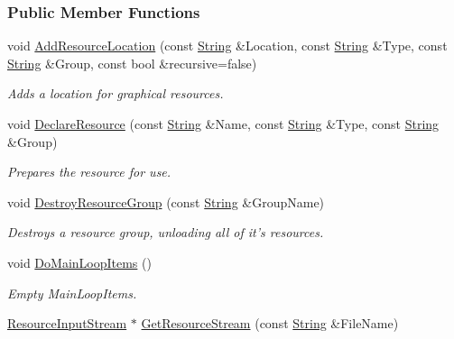 \subsubsection*{Public Member Functions}
\begin{DoxyCompactItemize}
\item 
void \hyperlink{classphys_1_1ResourceManager_a0d7d3adce2ad4c70a3e867396e17b090}{AddResourceLocation} (const \hyperlink{namespacephys_aa03900411993de7fbfec4789bc1d392e}{String} \&Location, const \hyperlink{namespacephys_aa03900411993de7fbfec4789bc1d392e}{String} \&Type, const \hyperlink{namespacephys_aa03900411993de7fbfec4789bc1d392e}{String} \&Group, const bool \&recursive=false)
\begin{DoxyCompactList}\small\item\em Adds a location for graphical resources. \item\end{DoxyCompactList}\item 
void \hyperlink{classphys_1_1ResourceManager_a6ac7835a02dff32e60a73320f9c9dabb}{DeclareResource} (const \hyperlink{namespacephys_aa03900411993de7fbfec4789bc1d392e}{String} \&Name, const \hyperlink{namespacephys_aa03900411993de7fbfec4789bc1d392e}{String} \&Type, const \hyperlink{namespacephys_aa03900411993de7fbfec4789bc1d392e}{String} \&Group)
\begin{DoxyCompactList}\small\item\em Prepares the resource for use. \item\end{DoxyCompactList}\item 
void \hyperlink{classphys_1_1ResourceManager_afa5d686ad3b4c863580050994169cb6b}{DestroyResourceGroup} (const \hyperlink{namespacephys_aa03900411993de7fbfec4789bc1d392e}{String} \&GroupName)
\begin{DoxyCompactList}\small\item\em Destroys a resource group, unloading all of it's resources. \item\end{DoxyCompactList}\item 
void \hyperlink{classphys_1_1ResourceManager_a2114714999441c095bc28d3673c2490e}{DoMainLoopItems} ()
\begin{DoxyCompactList}\small\item\em Empty MainLoopItems. \item\end{DoxyCompactList}\item 
\hyperlink{classphys_1_1ResourceInputStream}{ResourceInputStream} $\ast$ \hyperlink{classphys_1_1ResourceManager_a13f0aef080b9a353fe6c910c2781de50}{GetResourceStream} (const \hyperlink{namespacephys_aa03900411993de7fbfec4789bc1d392e}{String} \&FileName)

\end{DoxyCompactItemize}
